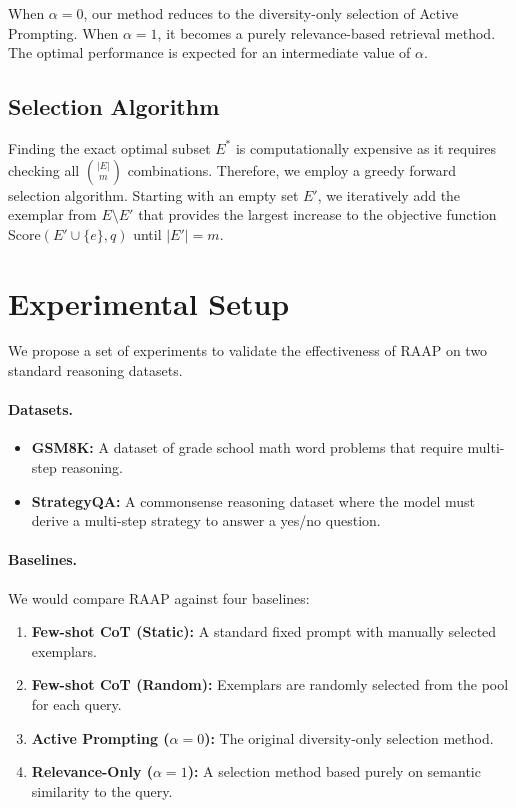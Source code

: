 \documentclass[10pt,twocolumn,letterpaper]{article}
\begin{document}
When $\alpha=0$, our method reduces to the diversity-only selection of Active Prompting. When $\alpha=1$, it becomes a purely relevance-based retrieval method. The optimal performance is expected for an intermediate value of $\alpha$.

\subsection{Selection Algorithm}

Finding the exact optimal subset $E^*$ is computationally expensive as it requires checking all $\binom{|E|}{m}$ combinations. Therefore, we employ a greedy forward selection algorithm. Starting with an empty set $E'$, we iteratively add the exemplar from $E \setminus E'$ that provides the largest increase to the objective function Score$(E' \cup \{e\}, q)$ until $|E'|=m$.

\section{Experimental Setup}

We propose a set of experiments to validate the effectiveness of RAAP on two standard reasoning datasets.

\paragraph{Datasets.}
\begin{itemize}
    \item \textbf{GSM8K:} A dataset of grade school math word problems that require multi-step reasoning.
    \item \textbf{StrategyQA:} A commonsense reasoning dataset where the model must derive a multi-step strategy to answer a yes/no question.
\end{itemize}

\paragraph{Baselines.}
We would compare RAAP against four baselines:
\begin{enumerate}
    \item \textbf{Few-shot CoT (Static):} A standard fixed prompt with manually selected exemplars.
    \item \textbf{Few-shot CoT (Random):} Exemplars are randomly selected from the pool for each query.
    \item \textbf{Active Prompting ($\alpha=0$):} The original diversity-only selection method.
    \item \textbf{Relevance-Only ($\alpha=1$):} A selection method based purely on semantic similarity to the query.
\end{enumerate}
\end{document}
